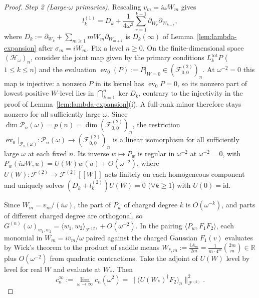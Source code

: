 \documentclass[twoside,10pt]{article}
\numberwithin{equation}{section}
\theoremstyle{slbody}
\theoremstyle{definition}
\theoremstyle{remark}
\begin{document}
\begin{proof}
\emph{Step 2 (Large-\(\omega\) primaries).}
Rescaling \(v_m=i\omega W_m\) gives
\[
 l_k^{(1)}=D_k+\frac{1}{4\omega^2}\sum_{r=1}^{k-1}\partial_{W_r}\partial_{W_{k-r}},
\]
where \(D_k:=\partial_{W_k}+\sum_{m\geq1}mW_m\partial_{W_{m+k}}\) is \(D_k(\infty)\) of
Lemma~\ref{lem:lambda-expansion} after \(\sigma_m=iW_m\).  Fix a
level \(n\geq0\).  On the finite-dimensional space \((\mathcal H_\omega)_n\),
consider the joint map given by the primary conditions
\(L_k^{\mathrm{tot}}P\) (\(1\leq k\leq n\)) and the evaluation
\(\operatorname{ev}_0(P):=P|_{W=0}\in(\mathcal F^{(2)}_{0,0})_n\).  At
\(\omega^{-2}=0\) this map is injective: a nonzero \(P\) in its kernel has
\(\operatorname{ev}_0P=0\), so its nonzero part of lowest positive \(W\)-level
lies in \(\bigcap_{k=1}^n\ker D_k\), contrary to the injectivity in the proof of
Lemma~\ref{lem:lambda-expansion}(i).  A full-rank minor therefore stays
nonzero for all sufficiently large \(\omega\).  Since
\(\dim\mathcal P_n(\omega)=p(n)=\dim(\mathcal F^{(2)}_{0,0})_n\), the
restriction
\(\operatorname{ev}_0|_{\mathcal P_n(\omega)}:\mathcal P_n(\omega)\to(\mathcal F^{(2)}_{0,0})_n\)
is a linear isomorphism for all sufficiently large \(\omega\) at each fixed
\(n\).  Its inverse \(w\mapsto P_w\) is regular in \(\omega^{-2}\) at
\(\omega^{-2}=0\), with \(P_w(i\omega W,u)=U(W)w(u)+O(\omega^{-2})\), where
\(U(W):\mathcal F^{(2)}\to\mathcal F^{(2)}[[W]]\) acts finitely on each
homogeneous component and uniquely solves \((D_k+l_k^{(2)})U(W)=0\)
(\(\forall k\geq1\)) with \(U(0)=\mathrm{id}\).

Since \(W_m=v_m/(i\omega)\), the part of \(P_w\) of charged degree \(k\) is
\(O(\omega^{-k})\), and parts of different charged degree are orthogonal, so
\(G^{(n)}(\omega)_{w_1,w_2}=\langle w_1,w_2\rangle_{\mathcal F^{(2)}}+O(\omega^{-2})\).
In the pairing \(\langle P_w,F_1F_2\rangle\), each monomial in
\(\overline{W_m}=i\bar v_m/\omega\) paired against the charged Gaussian
\(F_1(v)\) evaluates by Wick's theorem to the product of saddle means
\(W_{*,m}:=\frac{iA_m}{2m}=\frac{1}{m\cdot 4^m}\binom{2m}{m}\in\mathbb R\)
plus \(O(\omega^{-2})\) from quadratic contractions.  Take the adjoint of
\(U(W)\) level by level for real \(W\) and evaluate at \(W_*\).  Then
\[
 c_n^\infty:=\lim_{\omega\to\infty}c_n(\omega^2)
 =\bigl\|\bigl(U(W_*)^\dagger F_2\bigr)_n\bigr\|_{\mathcal F^{(2)}}^2.
\]


\end{proof}
\end{document}
